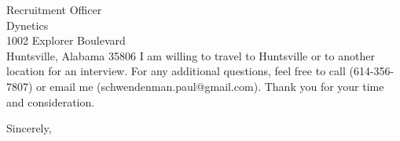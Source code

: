\documentclass[11pt]{letter} %
\begin{document}
\begin{letter}{Recruitment Officer \\
Dynetics \\
1002 Explorer Boulevard\\
Huntsville, Alabama 35806}
I am willing to travel to Huntsville or to another location for an
interview.  For any additional questions, feel free to call (614-356-7807)
or email me (schwendenman.paul@gmail.com).  Thank you for your time and
consideration.

\closing{Sincerely,}




\end{letter}
\end{document}

